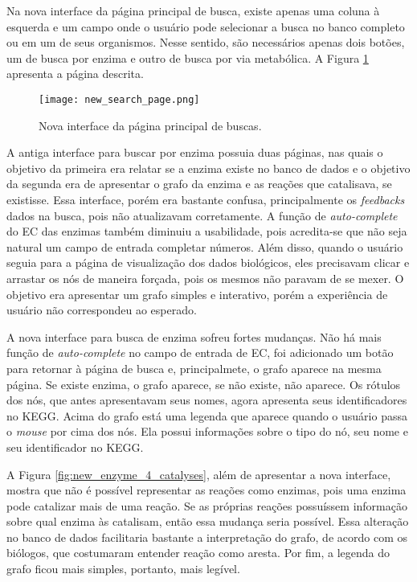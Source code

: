 \indent Na nova interface da página principal de busca, existe apenas uma coluna à esquerda e um campo onde o usuário pode selecionar a busca no banco completo ou em um de seus organismos. Nesse sentido, são necessários apenas dois botões, um de busca por enzima e outro de busca por via metabólica. A Figura \ref{fig:new_search_page} apresenta a página descrita.

\begin{figure}[!h]
    \centering
    \texttt{[image: new\_search\_page.png]}
    \caption{Nova interface da página principal de buscas.}
    \label{fig:new_search_page}
\end{figure}

\indent A antiga interface para buscar por enzima possuia duas páginas, nas quais o objetivo da primeira era relatar se a enzima existe no banco de dados e o objetivo da segunda era de apresentar o grafo da enzima e as reações que catalisava, se existisse. Essa interface, porém era bastante confusa, principalmente os \textit{feedbacks} dados na busca, pois não atualizavam corretamente. A função de \textit{auto-complete} do EC das enzimas também diminuiu a usabilidade, pois acredita-se que não seja natural um campo de entrada completar números. Além disso, quando o usuário seguia para a página de visualização dos dados biológicos, eles precisavam clicar e arrastar os nós de maneira forçada, pois os mesmos não paravam de se mexer. O objetivo era apresentar um grafo simples e interativo, porém a experiência de usuário não correspondeu ao esperado.

\indent A nova interface para busca de enzima sofreu fortes mudanças. Não há mais função de \textit{auto-complete} no campo de entrada de EC, foi adicionado um botão para retornar à página de busca e, principalmete, o grafo aparece na mesma página. Se existe enzima, o grafo aparece, se não existe, não aparece. Os rótulos dos nós, que antes apresentavam seus nomes, agora apresenta seus identificadores no KEGG. Acima do grafo está uma legenda que aparece quando o usuário passa o \textit{mouse} por cima dos nós. Ela possui informações sobre o tipo do nó, seu nome e seu identificador no KEGG.

\indent A Figura \ref{fig:new_enzyme_4_catalyses}, além de apresentar a nova interface, mostra que não é possível representar as reações como enzimas, pois uma enzima pode catalizar mais de uma reação. Se as próprias reações possuíssem informação sobre qual enzima às catalisam, então essa mudança seria possível. Essa alteração no banco de dados facilitaria bastante a interpretação do grafo, de acordo com os biólogos, que costumaram entender reação como aresta. Por fim, a legenda do grafo ficou mais simples, portanto, mais legível.

